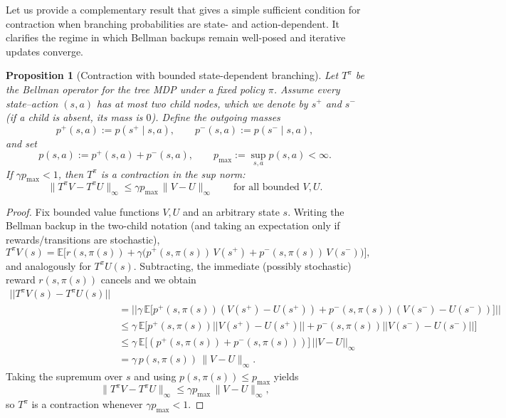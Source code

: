 \documentclass[preprint,12pt]{elsarticle} %
\theoremstyle{plain}
\newtheorem{proposition}[theorem]{Proposition}
\theoremstyle{definition}
\theoremstyle{remark}
\begin{document}
Let us provide a complementary result that gives a simple sufficient condition for contraction when branching probabilities are state- and action-dependent. It clarifies the regime in which Bellman backups remain well-posed and iterative updates converge.

\begin{proposition}[Contraction with bounded state-dependent branching]
\label{prop:state_dependent_contraction}
Let $T^\pi$ be the Bellman operator for the tree MDP under a fixed policy $\pi$. Assume every state--action $(s,a)$ has at most two child nodes, which we denote by $s^+$ and $s^-$ (if a child is absent, its mass is $0$). 
Define the outgoing masses
\begin{equation}
p^+(s,a):=p(s^+\mid s,a),\qquad p^-(s,a):=p(s^-\mid s,a),
\end{equation}
and set
\begin{equation}
p(s,a):=p^+(s,a)+p^-(s,a),\qquad p_{\max}:=\sup_{s,a} p(s,a) <\infty.
\end{equation}
If $\gamma p_{\max}<1$, then $T^\pi$ is a contraction in the sup norm:
\begin{equation}
\|T^\pi V - T^\pi U\|_\infty \le \gamma p_{\max}\,\|V-U\|_\infty
\qquad\text{for all bounded }V,U.
\end{equation}
\end{proposition}

\begin{proof}
Fix bounded value functions $V,U$ and an arbitrary state $s$. Writing the Bellman backup in the two-child notation (and taking an expectation only if rewards/transitions are stochastic),
\begin{equation}
T^\pi V(s)=\mathbb{E}\big[ r(s,\pi(s)) + \gamma\big(p^+(s,\pi(s))\,V(s^+)+p^-(s,\pi(s))\,V(s^-)\big)\big],
\end{equation}
and analogously for $T^\pi U(s)$. Subtracting, the immediate (possibly stochastic) reward $r(s,\pi(s))$ cancels and we obtain
\begin{equation}
\begin{aligned}
||T^\pi V(s)-T^\pi U(s)|| \\
&= \Big|\Big|\gamma\,\mathbb{E}\!\big[p^+(s,\pi(s))(V(s^+)-U(s^+)) + p^-(s,\pi(s))(V(s^-)-U(s^-))\big]\Big|\Big|\\
&\le \gamma\,\mathbb{E}\!\big[ p^+(s,\pi(s))||V(s^+)-U(s^+)|| + p^-(s,\pi(s))||V(s^-)-U(s^-)||\big]\\
&\le \gamma\,\mathbb{E}\!\big[ (p^+(s,\pi(s))+p^-(s,\pi(s)))\big]\,||V-U||_\infty\\
&= \gamma\,p(s,\pi(s))\,\|V-U\|_\infty.
\end{aligned}
\end{equation}
Taking the supremum over $s$ and using $p(s,\pi(s))\le p_{\max}$ yields
\begin{equation}
\|T^\pi V - T^\pi U\|_\infty \le \gamma p_{\max}\,\|V-U\|_\infty,
\end{equation}
so $T^\pi$ is a contraction whenever $\gamma p_{\max}<1$.
\end{proof}
\end{document}
